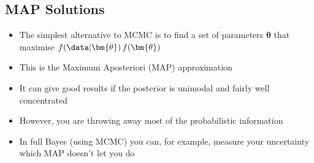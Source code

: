 \Outline %

\begin{slide}
\section{MAP Solutions}

\begin{PauseHighLight}
  \begin{itemize}
  \item The simplest alternative to MCMC is to find a set of parameters
    $\bm{\theta}$ that maximise $f(\data|\bm{\theta})\,
    f(\bm{\theta})$\pause
  \item This is the Maximum Aposteriori (MAP) approximation\pause
  \item It can give good results if the posterior is unimodal and fairly
    well concentrated\pause
  \item However, you are throwing away most of the probabilistic
    information\pause
  \item In full Bayes (using MCMC) you can, for example, measure your
    uncertainty which MAP doesn't let you do\pause
  \end{itemize}
\end{PauseHighLight}

\end{slide}


